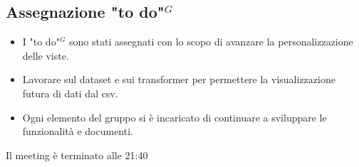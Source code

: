 \subsection{Assegnazione "to do"$^{G}$}
\begin{itemize}
	\item I "to do"$^{G}$ sono stati assegnati con lo scopo di avanzare la personalizzazione delle viste.
	\item Lavorare sul dataset e sui transformer per permettere la visualizzazione futura di dati dal csv.
	\item Ogni elemento del gruppo si è incaricato di continuare a sviluppare le funzionalità e documenti.
\end{itemize}

Il meeting è terminato alle 21:40

